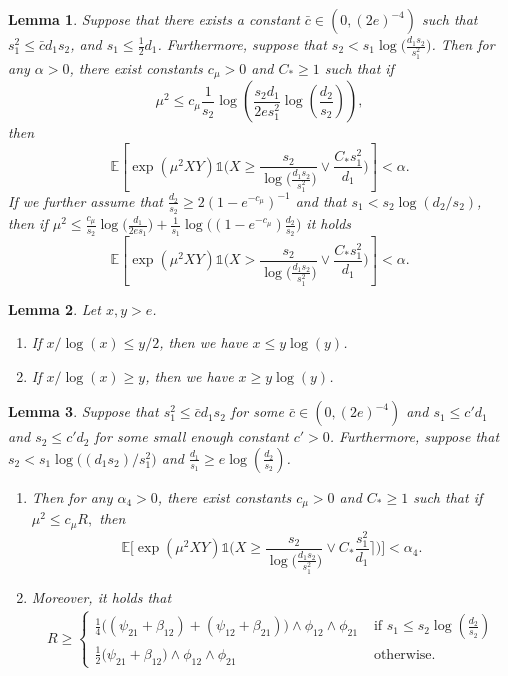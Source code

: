 \documentclass[10pt,a4paper]{amsart}
\newtheorem{lemma}{Lemma}
\newcommand{\Ct}{C_{*}}
\newcommand{\EE}{\mathbb{E}}
\newcommand{\one}{\mathds{1}}
\begin{document}
\begin{lemma}\label{lem_max_test_lower_bound}
    Suppose that there exists a constant $\bar{c} \in (0,(2e)^{-4})$ such that $s_1^2 \leq \bar{c}d_1s_2$, and $s_1 \leq \frac12d_1$. 
    Furthermore, suppose that $s_2 < s_1\log\big(\frac{d_1s_2}{s_1^2}\big)$. Then for any $\alpha > 0$, there exist  constants $c_\mu > 0$ and $C_* \geq 1$ such that if 
    $$\mu^2 \leq c_\mu\frac{1}{s_2}\log\left(\frac{s_2d_1}{2es_1^2} \log\left(\frac{d_2}{s_2}\right)\right),$$
    then 
    \[\EE\left[\exp(\mu^2XY)\one\Big(X \geq \frac{s_2}{\log\big(\frac{d_1s_2}{s_1^2}\big)}\vee   \frac{\Ct s_1^2}{d_1}\Big)\right] < \alpha.\]
    If we further assume that $\frac{d_2}{s_2} \geq 2(1 - e^{-c_\mu})^{-1}$ and that $s_1 < s_2\log(d_2/s_2)$, then if $\mu^2 \leq \frac{c_\mu}{s_2}\log\big(\frac{d_1}{2es_1}\big) + \frac{1}{s_1}\log\big((1-e^{-c_\mu})\frac{d_2}{s_2}\big)$ it holds
\[\EE\left[\exp(\mu^2XY)\one\Big(X > \frac{s_2}{\log\big(\frac{d_1s_2}{s_1^2}\big)}\vee   \frac{\Ct s_1^2}{d_1}\Big)\right] < \alpha.\]
\end{lemma}

\begin{lemma}\label{lem_logs}
    Let $x,y > e$.
    \begin{enumerate}
        \item[(i)] If $x/\log(x) \leq y/2$, then we have $x \leq y \log(y)$.
        \item[(ii)] If $x/\log(x) \geq y$, then we have $x \geq y \log(y)$.
    \end{enumerate}
\end{lemma}

\begin{lemma}\label{lem_simplification_rate_max_test}
    Suppose that $s_1^2 \leq \bar{c}d_1s_2$ for some $\bar{c} \in (0,(2e)^{-4})$ and $s_1 \leq c'd_1$ and $s_2 \leq c' d_2$ for some small enough constant $c'>0$. Furthermore, suppose that $s_2 < s_1\log\big((d_1s_2)/s_1^2\big)$ and $\frac{d_1}{s_1} \geq e \log\left(\frac{d_2}{s_2}\right)$. 
    \begin{enumerate}
        \item Then for any $\alpha_4 > 0$, there exist constants $c_\mu > 0$ and $C_* \geq 1$ such that if $\mu^2 \leq c_\mu R,$ then 
    \[\EE\Big[\exp(\mu^2XY)\one\Big(X \geq \frac{s_2}{\log\big(\frac{d_1s_2}{s_1^2}\big)} \lor  \Ct \frac{s_1^2}{d_1}\Big\rceil\Big)\Big] < \alpha_4.\]
    \item Moreover, it holds that 
    \begin{align*}
        R \geq \begin{cases}
            \frac{1}{4}\big((\psi_{21}+\beta_{12}) + (\psi_{12} + \beta_{21})\big) \land \phi_{12} \land \phi_{21}& \text{ if } s_1 \leq s_2\log\left(\frac{d_2}{s_2}\right)\\
            \frac{1}{2}\big(\psi_{21} + \beta_{12}\big) \land \phi_{12} \land \phi_{21} & \text{ otherwise.}
        \end{cases}
    \end{align*}
    \end{enumerate}
\end{lemma}
\end{document}
